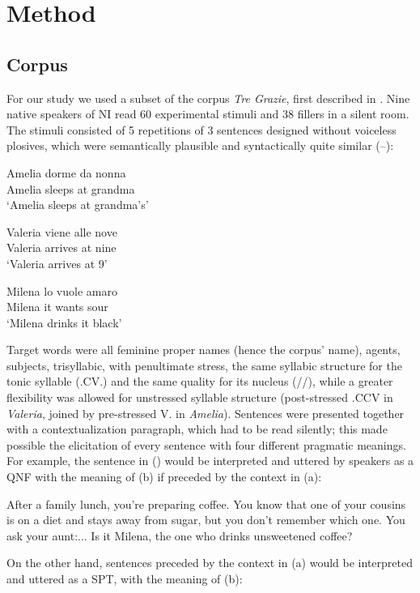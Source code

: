 \section{Method}\label{sec22}
\subsection{Corpus}\label{sec221}
For our study we used a subset of the corpus \textit{Tre Grazie}, first described in \citet{dimperio2008phonetics}. Nine native speakers of NI read 60 experimental stimuli and 38 fillers in a silent room. The stimuli consisted of 5 repetitions of 3 sentences designed without voiceless plosives, which were semantically plausible and syntactically quite similar (--):

\ea
\gll Amelia dorme da nonna\\
Amelia sleeps at grandma\\
\glt ‘Amelia sleeps at grandma's’
\z

\ea
\gll Valeria viene alle nove\\
Valeria arrives at nine\\
\glt ‘Valeria arrives at 9’
\z

\ea
\gll Milena lo vuole amaro\\
Milena it wants sour\\
\glt ‘Milena drinks it black’
\z

Target words were all feminine proper names (hence the corpus' name), agents, subjects, trisyllabic, with penultimate stress, the same syllabic structure for the tonic syllable (.CV.) and the same quality for its nucleus (//), while a greater flexibility was allowed for unstressed syllable structure (post-stressed .CCV in \textit{Valeria}, joined by pre-stressed V. in \textit{Amelia}). Sentences were presented together with a contextualization paragraph, which had to be read silently; this made possible the elicitation of every sentence with four different pragmatic meanings. For example, the sentence in () would be interpreted and uttered by speakers as a QNF with the meaning of (b) if preceded by the context in (a):

\eal
\ex After a family lunch, you’re preparing coffee. You know that one of your cousins is on a diet and stays away from sugar, but you don’t remember which one. You ask your aunt:...
\ex Is it Milena, the one who drinks unsweetened coffee?
\zl

On the other hand, sentences preceded by the context in (a) would be interpreted and uttered as a SPT, with the meaning of (b):

